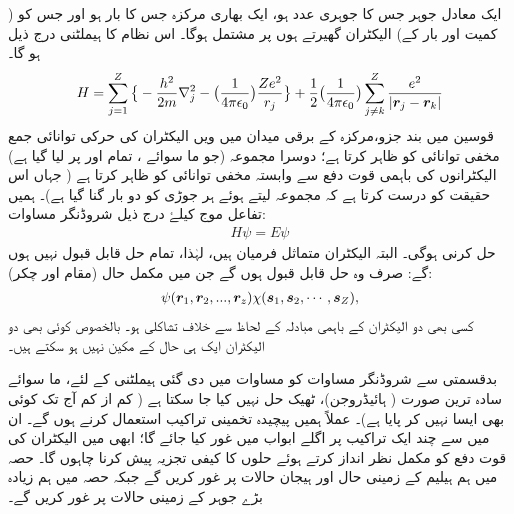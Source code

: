 ایک معادل جوہر جس کا جوہری عدد  ہو، ایک بھاری مرکزہ جس کا بار   ہو اور جس کو   ( کمیت    اور بار  کے)   الیکٹران گھیرتے  ہوں پر مشتمل ہوگا۔ اس نظام کا ہیملٹنی درج ذیل ہو گا۔
\begin{align}\label{مساوات_متماثل_ہیملٹنی_جوہر_عمومی}
H=\sum_{j=1}^{Z} \big\{ -\frac{h^2}{2m}\nabla_j^2-\big(\frac{1}{4\pi\epsilon_{0}}\big)  \frac{Ze^2}{r_{j}} \big\} + \frac{1}{2}\big(\frac{1}{4\pi\epsilon_{0}}\big) \sum_{j\ne  k}^{Z} \frac{e^2}{|{{\boldsymbol{r}}}_{j} - {{\boldsymbol{r}}}_{k} |}
\end{align}
 قوسین میں بند جزو،مرکزہ کے برقی میدان میں  ویں  الیکٹران کی حرکی توانائی جمع مخفی توانائی کو ظاہر کرتا ہے؛  دوسرا  مجموعہ   (جو  ما سوائے ،  تمام  اور  پر   لیا گیا ہے)   الیکٹرانوں کی  باہمی قوت دفع  سے وابستہ مخفی   توانائی کو ظاہر کرتا ہے ( جہاں  اس حقیقت کو درست کرتا ہے کہ مجموعہ لیتے ہوئے ہر جوڑی کو دو بار گنا  گیا ہے)۔ ہمیں 
 تفاعل موج  کیلۓ درج ذیل شروڈنگر مساوات:
\begin{align}\label{مساوات_متماثل_شروڈنگر_عمومی_جوہر}
 H\psi=E\psi
\end{align}
 حل کرنی ہوگی۔ البتہ  الیکٹران متماثل فرمیان ہیں، لہٰذا،  تمام حل قابل قبول نہیں ہوں گے: صرف وہ حل قابل قبول ہوں گے جن میں  مکمل حال  (مقام اور چکر):
\begin{align}
 \psi({{\boldsymbol{r}}}_{1},{{\boldsymbol{r}}}_{2},...,{{\boldsymbol{r}}}_{z}) \chi({{\boldsymbol{s}}}_{1},{{\boldsymbol{s}}}_{2},\cdots,{{\boldsymbol{s}}}_{Z}), 
\end{align}
کسی بھی دو الیکٹران کے باہمی مبادلہ کے لحاظ سے خلاف تشاکلی ہو۔ بالخصوص کوئی بھی دو الیکٹران ایک ہی حال کے مکین نہیں ہو سکتے ہیں۔

 بدقسمتی سے شروڈنگر مساوات کو مساوات  میں دی گئی ہیملٹنی کے لئے،   ما سوائے سادہ ترین صورت (  ہائیڈروجن)،    ٹھیک حل نہیں کیا جا سکتا ہے ( کم از کم آج تک کوئی بھی ایسا نہیں کر پایا ہے)۔ عملاً ہمیں  پیچیدہ تخمینی تراکیب استعمال کرنے ہوں گے۔ ان میں سے چند ایک تراکیب پر اگلے ابواب  میں غور کیا جائے گا؛  ابھی میں الیکٹران کی قوت دفع کو مکمل  نظر انداز کرتے ہوئے حلوں کا کیفی تجزیہ پیش کرنا چاہوں گا۔ حصہ    میں ہم ہیلیم کے  زمینی حال اور ہیجان  حالات پر غور کریں گے  جبکہ حصہ   میں ہم زیادہ بڑے  جوہر  کے زمینی حالات پر غور کریں گے۔


